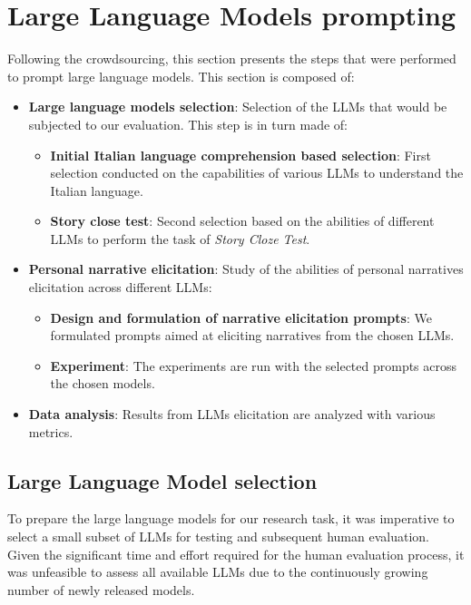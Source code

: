 \section{Large Language Models prompting}
Following the crowdsourcing, this section presents the steps that were performed to prompt large language models. This section is composed of:
\begin{itemize}
    \item \textbf{Large language models selection}: Selection of the LLMs that would be subjected to our evaluation. This step is in turn made of:
    \begin{itemize}
        \item \textbf{Initial Italian language comprehension based selection}: First selection conducted on the capabilities of various LLMs to understand the Italian language.
        \item \textbf{Story close test}: Second selection based on the abilities of different LLMs to perform the task of \emph{Story Cloze Test}.
    \end{itemize}
    \item \textbf{Personal narrative elicitation}: Study of the abilities of personal narratives elicitation across different LLMs:
    \begin{itemize}
        \item \textbf{Design and formulation of narrative elicitation prompts}: We formulated prompts aimed at eliciting narratives from the chosen LLMs.
        \item \textbf{Experiment}: The experiments are run with the selected prompts across the chosen models.
    \end{itemize}
    \item \textbf{Data analysis}: Results from LLMs elicitation are analyzed with various metrics.
\end{itemize}
\subsection{Large Language Model selection}
To prepare the large language models for our research task, it was imperative to select a small subset of LLMs for testing and subsequent human evaluation. Given the significant time and effort required for the human evaluation process, it was unfeasible to assess all available LLMs due to the continuously growing number of newly released models.

